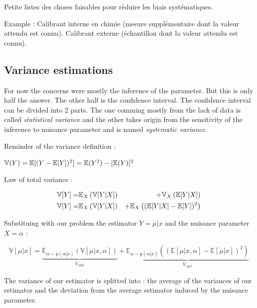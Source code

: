 Petite listes des choses faisables pour réduire les biais systématiques. 


Example : Calibrant interne en chimie (mesure supplémentaire dont la valeur attendu est connu). Calibrant externe (échantillon dont la valeur attendu est connu).








\subsection{Variance estimations} %
\label{sub:variance_estimations}

For now the concerns were mostly the inference of the parameter.
But this is only half the answer.
The other half is the confidence interval.
The confidence interval can be divided into 2 parts.
The one comming mostly from the lack of data is called \emph{statistical variance} and the other takes origin from the sensitivity of the inference to nuisance parameter and is named \emph{systematic variance}.

Reminder of the variance definition :

$\mathbb{V}(Y) = \mathbb{E}[(Y - \mathbb{E}[Y])^2] = \mathbb{E}(Y^2) - [\mathbb{E}(Y)]^2$

Law of total variance \needcite :

\begin{eqnarray}
\label{eq:total_variance_law}
    \mathbb{V}[Y] =& \mathbb{E}_X \left (\mathbb{V}[Y|X] \right ) &+ \mathbb{V}_X \left (\mathbb{E}[Y|X]\right ) \\
    \mathbb{V}[Y] =& \mathbb{E}_X \left (\mathbb{V}[Y|X] \right ) &+ \mathbb{E}_X \left ( (\mathbb{E} [Y|X]  - \mathbb{E}[Y])^2\right )
\end{eqnarray}


Substituing with our problem the estimator $Y = \mu|x$ and the nuisance parameter $X = \alpha$ :

\begin{equation}
\label{eq:stat_and_syst_variance_definition}
\mathbb{V}[\mu|x] 
	= \underbrace{\mathbb{E}_{\alpha \sim p(\alpha|x)} \left (\mathbb{V}[\mu|x, \alpha] \right )}_{V_{stat}} 
	+ \underbrace{\mathbb{E}_{\alpha \sim p(\alpha|x)} \left ( (\mathbb{E} [\mu|x, \alpha]  - \mathbb{E}[\mu|x])^2\right )}_{V_{syst}}
\end{equation}

The variance of our estimator is splitted into :
the average of the variances of our estimator and the deviation from the average estimator induced by the nuisance parameter.







